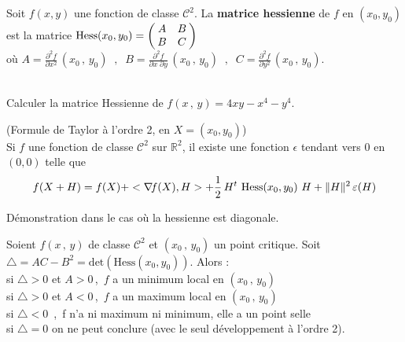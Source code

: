 \documentclass[12pt, class=report,crop=false]{standalone}
\begin{document}
{{\begin{definition}
 Soit $f(x,y)$ une fonction de classe $\mathcal{C}^2$.
La {\bf matrice hessienne} de $f$ en $(x_0,y_0)$ est la matrice
$\mathrm{Hess}(x_0,y_0) = \left(\hspace{-1mm} \begin{array}{cc}
A & B \\
B & C
\end{array}\hspace{-1mm}\right)$\\
o\`u $A = \displaystyle \frac{\partial^2 f}{\partial x^2}\, (x_{0}\,,\,y_{0}) \;\;,\;\;B = \frac{\partial^2 f}{\partial x\; \partial y}\, (x_{0}\,,\,y_{0}) \;\;,\;\; C = \displaystyle \frac{\partial^2 f}{\partial y^2}\, (x_{0}\,,\,y_{0})$.
\end{definition}


\\
Calculer la matrice Hessienne de $f(x\,,\,y) = 4xy - x^4 - y^4$.


\begin{theoreme} (Formule de Taylor \`a l'ordre 2, en 
$X=(x_0,y_0)$)\\ Si  $f$ une fonction de classe $\mathcal{C}^2$ sur $\mathbb R^2$, il existe une fonction $\epsilon$ tendant vers 0 en $(0,0)$ telle que
$$f(X + H) = f(X) + <\nabla\hspace{-0.6mm} f(X) , H> + \displaystyle \frac{1}{2} \, 
H^t\ \mathrm{Hess}(x_0,y_0)\ H + \|H\|^2\, \varepsilon (H)$$
\end{theoreme}

Démonstration dans le cas o\`u la hessienne est diagonale.




\begin{theoreme}
Soient $f(x\,,\,y)$ de classe $\mathcal{C}^2$ et $(x_{0}\,,\,y_{0})$ un point critique.
Soit $\triangle = AC - B^2=\mathrm{det}(\mathrm{Hess}(x_0,y_0))$.
Alors :\\
si $\triangle > 0$ et $A > 0$\,,\, $f$ a un minimum local en $(x_{0}\,,\,y_{0})$\\
si $\triangle > 0$ et $A < 0$\,,\, $f$ a un maximum local en $(x_{0}\,,\,y_{0})$\\
si $\triangle < 0$ \,,\, f n'a ni maximum ni minimum, elle a un point selle\\
si $\triangle = 0$ on ne peut conclure (avec le seul développement \`a l'ordre 2).
\end{theoreme}

}}
\end{document}

